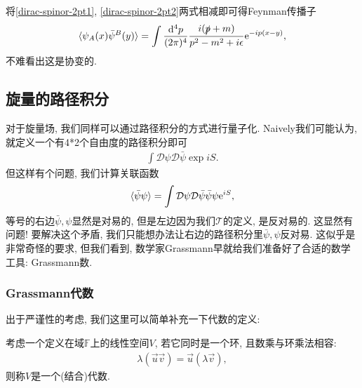 将\eqref{dirac-spinor-2pt1}, \eqref{dirac-spinor-2pt2}两式相减即可得Feynman传播子
\begin{equation}
    \braket{\psi_A(x)\bar\psi^B(y)}=\int\frac{\mathrm d^4p}{(2\pi)^4}\frac{i(\slashed p+m)}{p^2-m^2+i\epsilon}\mathrm e^{-ip(x-y)},
\end{equation}
不难看出这是协变的.


\subsection{旋量的路径积分}
对于旋量场, 我们同样可以通过路径积分的方式进行量子化. Naively我们可能认为, 就定义一个有4*2个自由度的路径积分即可
\begin{align}
    \int\mathcal D\psi\mathcal D\bar\psi\exp{iS}.
\end{align}
但这样有个问题, 我们计算关联函数
\begin{align}
    \braket{\bar\psi\psi}=\int\mathcal D\psi\mathcal D\bar\psi\bar\psi\psi\mathrm e^{iS},
\end{align}
等号的右边$\bar\psi, \psi$显然是对易的, 但是左边因为我们$\mathcal T$的定义, 是反对易的. 这显然有问题! 要解决这个矛盾, 我们只能想办法让右边的路径积分里$\bar\psi, \psi$反对易. 这似乎是非常奇怪的要求, 但我们看到, 数学家Grassmann早就给我们准备好了合适的数学工具: Grassmann数.
\subsubsection{Grassmann代数}
出于严谨性的考虑, 我们这里可以简单补充一下代数的定义:
\begin{definition}[代数]
    考虑一个定义在域$\mathbb F$上的线性空间$V$, 若它同时是一个环, 且数乘与环乘法相容:
    \begin{align}
        \lambda(\vec u\vec v)=\vec u(\lambda\vec v),
    \end{align}
    则称$V$是一个(结合)代数.
\end{definition}

